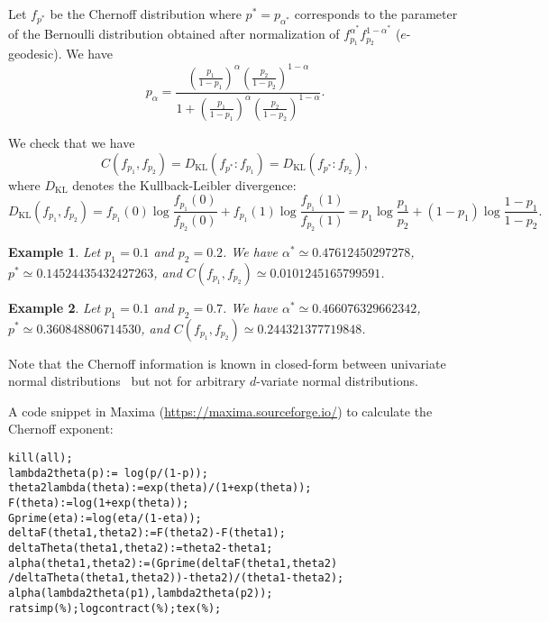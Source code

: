\documentclass[11pt]{article}
\def\KL{\mathrm{KL}}
\newtheorem{Example}{Example}
\begin{document}
 

Let $f_{p^*}$ be the Chernoff distribution where $p^*=p_{\alpha^*}$ corresponds to the parameter of the Bernoulli distribution obtained after normalization of
 $f_{p_1}^{\alpha^*} f_{p_2}^{1-\alpha^*}$ ($e$-geodesic).
We have
$$
p_\alpha= \frac{\left(\frac{p_1}{1-p_1}\right)^{\alpha}\left( \frac{p_2}{1-p_2}\right)^{1-\alpha}}{1+
\left(\frac{p_1}{1-p_1}\right)^{\alpha}\left( \frac{p_2}{1-p_2}\right)^{1-\alpha}}.
$$

We check that we have
$$
C(f_{p_1},f_{p_2})=D_\KL(f_{p^*}:f_{p_1})=D_\KL(f_{p^*}:f_{p_2}),
$$
where $D_\KL$ denotes the Kullback-Leibler divergence:
$$
D_\KL(f_{p_1},f_{p_2})=f_{p_1}(0)\log\frac{f_{p_1}(0)}{f_{p_2}(0)}+f_{p_1}(1)\log\frac{f_{p_1}(1)}{f_{p_2}(1)}=
p_1\log\frac{p_1}{p_2}+(1-p_1)\log\frac{1-p_1}{1-p_2}.
$$

\begin{Example}
Let $p_1=0.1$ and $p_2=0.2$.
We have $\alpha^*\simeq 0.47612450297278$, $p^*\simeq 0.14524435432427263$, and 
$C(f_{p_1},f_{p_2})\simeq 0.0101245165799591$.
\end{Example}

\begin{Example}
Let $p_1=0.1$ and $p_2=0.7$.
We have $\alpha^*\simeq 0.466076329662342$, $p^*\simeq 0.360848806714530$, and 
$C(f_{p_1},f_{p_2})\simeq 0.244321377719848$.
\end{Example}
 



Note that the Chernoff information is known in closed-form between univariate normal distributions~\cite{nielsen2022revisiting} but not for arbitrary $d$-variate normal distributions.

A code snippet in {\sc Maxima} (\url{https://maxima.sourceforge.io/}) to calculate the Chernoff exponent:

{
\begin{verbatim}
kill(all);
lambda2theta(p):= log(p/(1-p));
theta2lambda(theta):=exp(theta)/(1+exp(theta));
F(theta):=log(1+exp(theta));
Gprime(eta):=log(eta/(1-eta));
deltaF(theta1,theta2):=F(theta2)-F(theta1);
deltaTheta(theta1,theta2):=theta2-theta1;
alpha(theta1,theta2):=(Gprime(deltaF(theta1,theta2)
/deltaTheta(theta1,theta2))-theta2)/(theta1-theta2);
alpha(lambda2theta(p1),lambda2theta(p2));
ratsimp(%);logcontract(%);tex(%);
\end{verbatim}
}



\end{document}
